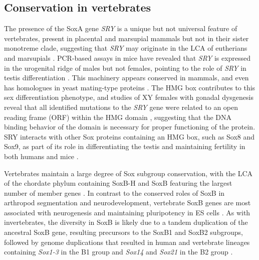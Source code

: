 \documentclass[withindex,glossary]{cam-thesis}
\begin{document}
\subsection{Conservation in vertebrates}

The presence of the SoxA gene \emph{SRY} is a unique but not universal
feature of vertebrates, present in placental and marsupial mammals but
not in their sister monotreme clade, suggesting that \emph{SRY} may
originate in the LCA of eutherians and marsupials . PCR-based assays in mice have revealed that
\emph{SRY} is expressed in the urogenital ridge of males but not
females, pointing to the role of \emph{SRY} in testis differentiation
. This machinery appears conserved in mammals, and
even has homologues in yeast mating-type proteins . The HMG box contributes to this sex differentiation phenotype,
and studies of XY females with gonadal dysgenesis reveal that all
identified mutations to the \emph{SRY} gene were related to an open
reading frame (\gls{ORF}) within the HMG domain ,
suggesting that the DNA binding behavior of the domain is necessary for
proper functioning of the protein. SRY interacts with other Sox proteins
containing an HMG box, such as Sox8 and Sox9, as part of its role in
differentiating the testis and maintaining fertility in both humans and
mice .

Vertebrates maintain a large degree of Sox subgroup conservation, with
the LCA of the chordate phylum containing SoxB-H and SoxB featuring the
largest number of member genes . In contrast to the
conserved roles of SoxB in arthropod segmentation and neurodevelopment,
vertebrate SoxB genes are most associated with neurogenesis and
maintaining pluripotency in ES cells . As with invertebrates, the diversity in SoxB is
likely due to a tandem duplication of the ancestral SoxB gene, resulting
precursors to the SoxB1 and SoxB2 subgroups, followed by genome
duplications that resulted in human and vertebrate lineages containing
\emph{Sox1-3} in the B1 group and \emph{Sox14} and \emph{Sox21} in the
B2 group .
\end{document}
